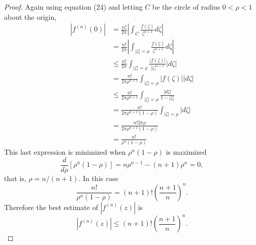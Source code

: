 \documentclass{article}
\begin{document}
\begin{proof}
  Again using equation (24) and letting $C$ be the circle of radius $0 < \rho < 1$ about the origin,
  \setcounter{equation}{0}
  \begin{align}
  |f^{(n)}(0)|
  &= \frac{n!}{2\pi}\left|\int_C \frac{f(\zeta)}{\zeta^{n+1}}d\zeta\right|\\
  &= \frac{n!}{2\pi}\left|\int_{|\zeta| = \rho} \frac{f(\zeta)}{\zeta^{n+1}}d\zeta\right|\\
  &\leq \frac{n!}{2\pi}\int_{|\zeta| = \rho} \frac{|f(\zeta)|}{|\zeta|^{n+1}}|d\zeta|\\
  &= \frac{n!}{2\pi\rho^{n+1}}\int_{|\zeta| = \rho} |f(\zeta)||d\zeta|\\
  &\leq \frac{n!}{2\pi\rho^{n+1}}\int_{|\zeta| = \rho} \frac{|d\zeta|}{1-|\zeta|}\\
  &= \frac{n!}{2\pi\rho^{n+1}(1-\rho)}\int_{|\zeta| = \rho} |d\zeta|\\
  &= \frac{n!2\pi\rho}{2\pi\rho^{n+1}(1-\rho)}\\
  &= \frac{n!}{\rho^n(1-\rho)}
  \end{align}
  This last expression is minimized when $\rho^n(1-\rho)$ is maximized \[
    \frac{d}{d\rho}[\rho^n(1-\rho)] = n\rho^{n-1} - (n + 1)\rho^n = 0,
  \] that is, $\rho = n/(n+1)$. In this case \[
    \frac{n!}{\rho^n(1-\rho)} = (n+1)!\left(\frac{n+1}{n}\right)^n.
  \] Therefore the best estimate of $|f^{(n)}(z)|$ is \[
    |f^{(n)}(z)| \leq (n+1)!\left(\frac{n+1}{n}\right)^n.
  \]
\end{proof}
\end{document}
